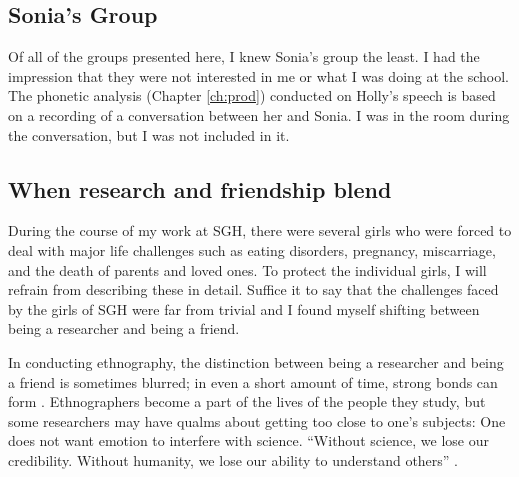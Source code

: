 \subsection{Sonia's Group}
Of all of the groups presented here, I knew Sonia's group the least. I had the impression that they were not interested in me or what I was doing at the school. The phonetic analysis (Chapter \ref{ch:prod}) conducted on Holly's speech is based on a recording of a conversation between her and Sonia. I was in the room during the conversation, but I was not included in it. 




\subsection{When research and friendship blend}

During the course of my work at SGH, there were several girls who were forced to deal with major life challenges such as eating disorders, pregnancy, miscarriage, and the death of parents and loved ones. To protect the individual girls, I will refrain from describing these in detail. Suffice it to say that the challenges faced by the girls of SGH were far from trivial and I found myself shifting between being a researcher and being a friend.

In conducting ethnography, the distinction between being a researcher and being a friend is sometimes blurred; in even a short amount of time, strong bonds can form \citep[79]{milroy1987}. Ethnographers become a part of the lives of the people they study, but some researchers may have qualms about getting too close to one's subjects: One does not want emotion to interfere with science. ``Without science, we lose our credibility. Without humanity, we lose our ability to understand others'' \citep[13]{agar1980}.

